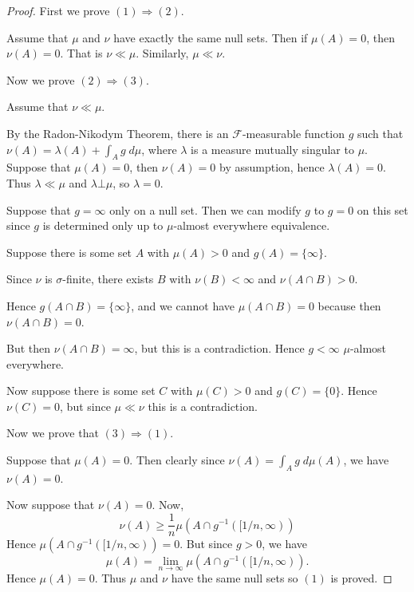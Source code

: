 \documentclass{unswmaths}
\begin{document}
\begin{proof}
    First we prove $(1)\Rightarrow(2)$.
    
    Assume that $\mu$ and $\nu$ have exactly the same null sets. 
    Then if $\mu(A) = 0$, then $\nu(A) = 0$.
    That is $\nu \ll \mu$. Similarly, $\mu \ll \nu$.
    
    Now we prove $(2)\Rightarrow(3)$. 
    
    Assume that $\nu \ll \mu$. 
    
    By the Radon-Nikodym Theorem,
    there is an $\mathcal{F}$-measurable function $g$
    such that $\nu(A) = \lambda(A)+\int_A g\;d\mu$,
    where $\lambda$ is a measure mutually singular to $\mu$. Suppose
    that $\mu(A) = 0$, then $\nu(A) = 0$ by assumption, hence $\lambda(A) = 0$.
    Thus $\lambda \ll \mu$ and $\lambda \bot \mu$, so $\lambda = 0$.
    
    Suppose that $g = \infty$ only on a null set. Then we can modify
    $g$ to $g = 0$ on this set since $g$ is determined only up
    to $\mu$-almost everywhere equivalence.
    
    Suppose there is some set $A$ with $\mu(A) > 0$ and $g(A) = \{\infty\}$.
    
    Since $\nu$ is $\sigma$-finite, there exists $B$ with $\nu(B) < \infty$
    and $\nu(A\cap B) > 0$.
    
    Hence $g(A\cap B) = \{\infty\}$, and we cannot have $\mu(A\cap B) = 0$
    because then $\nu(A\cap B) = 0$.
    
    But then $\nu(A\cap B) = \infty$, but this is a contradiction.
    Hence $g < \infty$ $\mu$-almost everywhere.
    
    Now suppose there is some set $C$ with $\mu(C) > 0$
    and $g(C) = \{0\}$. Hence $\nu(C) = 0$, but since $\mu \ll \nu$
    this is a contradiction.
    
    Now we prove that $(3)\Rightarrow(1)$.
    
    Suppose that $\mu(A) = 0$. Then clearly since $\nu(A) = \int_A g\;d\mu(A)$,
    we have $\nu(A) = 0$.
    
    Now suppose that $\nu(A) = 0$. Now,
    \begin{equation*}
        \nu(A) \geq \frac{1}{n}\mu(A\cap g^{-1}([1/n,\infty))
    \end{equation*}
    Hence $\mu(A\cap g^{-1}([1/n,\infty)) = 0$. But since $g > 0$, we
    have 
    \begin{equation*}
        \mu(A) = \lim_{n\rightarrow\infty} \mu(A\cap g^{-1}([1/n,\infty)).
    \end{equation*}
    Hence $\mu(A) = 0$. Thus $\mu$ and $\nu$ have the same null 
    sets so $(1)$ is proved.
\end{proof}
\end{document}
